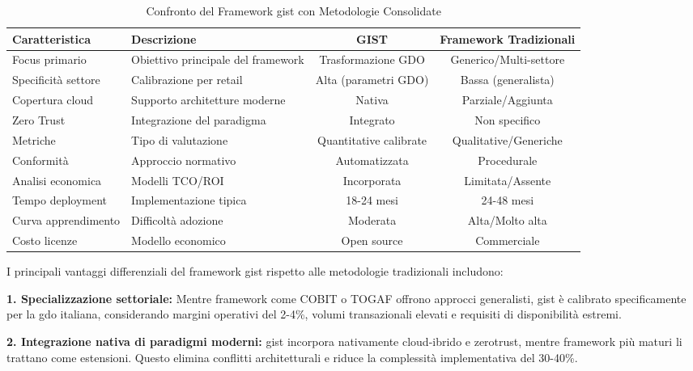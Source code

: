 \begin{table}[htbp]
\centering
\caption{Confronto del Framework \gls{gist} con Metodologie Consolidate}
\label{tab:framework_comparison_revised}
\small
\begin{tabularx}{\textwidth}{l X c c}
\toprule
\textbf{Caratteristica} & \textbf{Descrizione} & \textbf{GIST} & \textbf{Framework Tradizionali} \\
\midrule
\rowcolor{gray!10}
Focus primario & Obiettivo principale del framework & Trasformazione GDO & Generico/Multi-settore \\
Specificità settore & Calibrazione per retail & Alta (parametri GDO) & Bassa (generalista) \\
\rowcolor{gray!10}
Copertura cloud & Supporto architetture moderne & Nativa & Parziale/Aggiunta \\
Zero Trust & Integrazione del paradigma & Integrato & Non specifico \\
\rowcolor{gray!10}
Metriche & Tipo di valutazione & Quantitative calibrate & Qualitative/Generiche \\
Conformità & Approccio normativo & Automatizzata & Procedurale \\
\rowcolor{gray!10}
Analisi economica & Modelli TCO/ROI & Incorporata & Limitata/Assente \\
Tempo deployment & Implementazione tipica & 18-24 mesi & 24-48 mesi \\
\rowcolor{gray!10}
Curva apprendimento & Difficoltà adozione & Moderata & Alta/Molto alta \\
Costo licenze & Modello economico & Open source & Commerciale \\
\bottomrule
\end{tabularx}
\end{table}

I principali vantaggi differenziali del framework \gls{gist} rispetto alle metodologie tradizionali includono:

\textbf{1. Specializzazione settoriale:} Mentre framework come COBIT o TOGAF offrono approcci generalisti, \gls{gist} è calibrato specificamente per la \gls{gdo} italiana, considerando margini operativi del 2-4\%, volumi transazionali elevati e requisiti di disponibilità estremi.

\textbf{2. Integrazione nativa di paradigmi moderni:} \gls{gist} incorpora nativamente cloud-ibrido e \gls{zerotrust}, mentre framework più maturi li trattano come estensioni. Questo elimina conflitti architetturali e riduce la complessità implementativa del 30-40\%.

